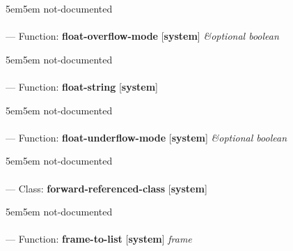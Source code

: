 \begin{adjustwidth}{5em}{5em}
not-documented
\end{adjustwidth}

\paragraph{}
\label{SYSTEM:FLOAT-OVERFLOW-MODE}
--- Function: \textbf{float-overflow-mode} [\textbf{system}] \textit{\&optional boolean}

\begin{adjustwidth}{5em}{5em}
not-documented
\end{adjustwidth}

\paragraph{}
\label{SYSTEM:FLOAT-STRING}
--- Function: \textbf{float-string} [\textbf{system}] \textit{}

\begin{adjustwidth}{5em}{5em}
not-documented
\end{adjustwidth}

\paragraph{}
\label{SYSTEM:FLOAT-UNDERFLOW-MODE}
--- Function: \textbf{float-underflow-mode} [\textbf{system}] \textit{\&optional boolean}

\begin{adjustwidth}{5em}{5em}
not-documented
\end{adjustwidth}

\paragraph{}
\label{SYSTEM:FORWARD-REFERENCED-CLASS}
--- Class: \textbf{forward-referenced-class} [\textbf{system}] \textit{}

\begin{adjustwidth}{5em}{5em}
not-documented
\end{adjustwidth}

\paragraph{}
\label{SYSTEM:FRAME-TO-LIST}
--- Function: \textbf{frame-to-list} [\textbf{system}] \textit{frame}

